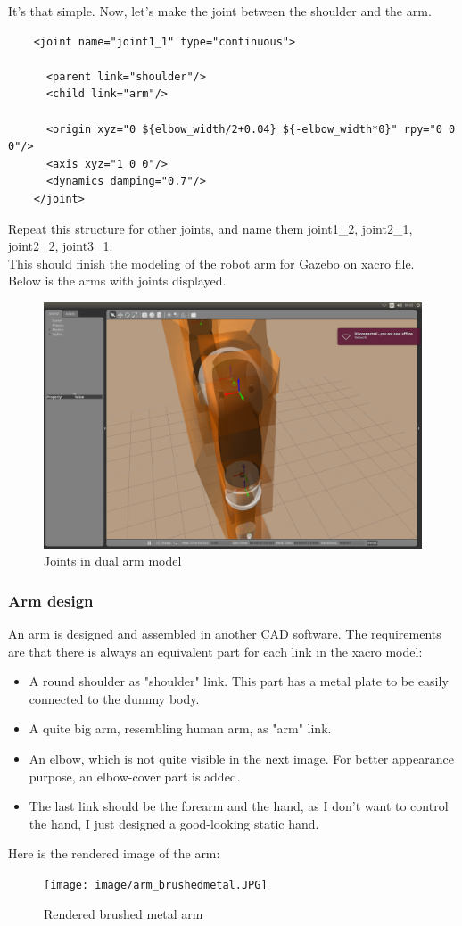 \documentclass[pdftex,12pt,a4paper]{article}
\begin{document}
  \newpage
  It's that simple. Now, let's make the joint between the shoulder and the arm.
  \begin{lstlisting}
    <joint name="joint1_1" type="continuous">
    
      <parent link="shoulder"/>
      <child link="arm"/>
      
      <origin xyz="0 ${elbow_width/2+0.04} ${-elbow_width*0}" rpy="0 0 0"/>
      <axis xyz="1 0 0"/>
      <dynamics damping="0.7"/>
    </joint>
  \end{lstlisting}
  Repeat this structure for other joints, and name them joint1\_2, joint2\_1, joint2\_2, joint3\_1.\\
  This should finish the modeling of the robot arm for Gazebo on xacro file.\\
  Below is the arms with joints displayed.
  \begin{figure}[h]
      \centering
      \includegraphics[width=0.9\linewidth]{image/arm_gazebo_joints.png}
      \caption{Joints in dual arm model}
      \label{fig:arm_gazebo_joint}
  \end{figure}
  
  \newpage
  \subsubsection{Arm design}
  An arm is designed and assembled in another CAD software. The requirements are that there is always an equivalent part for each link in the xacro model:
  \begin{itemize}
  \item A round shoulder as "shoulder" link. This part has a metal plate to be easily connected to the dummy body.
  \item A quite big arm, resembling human arm, as "arm" link.
  \item An elbow, which is not quite visible in the next image. For better appearance purpose, an elbow-cover part is added.
  \item The last link should be the forearm and the hand, as I don't want to control the hand, I just designed a good-looking static hand.
  \end{itemize}
  Here is the rendered image of the arm:
  \begin{figure}[h]
      \centering
      \texttt{[image: image/arm\_brushedmetal.JPG]}
      \caption{Rendered brushed metal arm}
      \label{fig:arm_gazebo_rendered}
  \end{figure}
  
\end{document}
